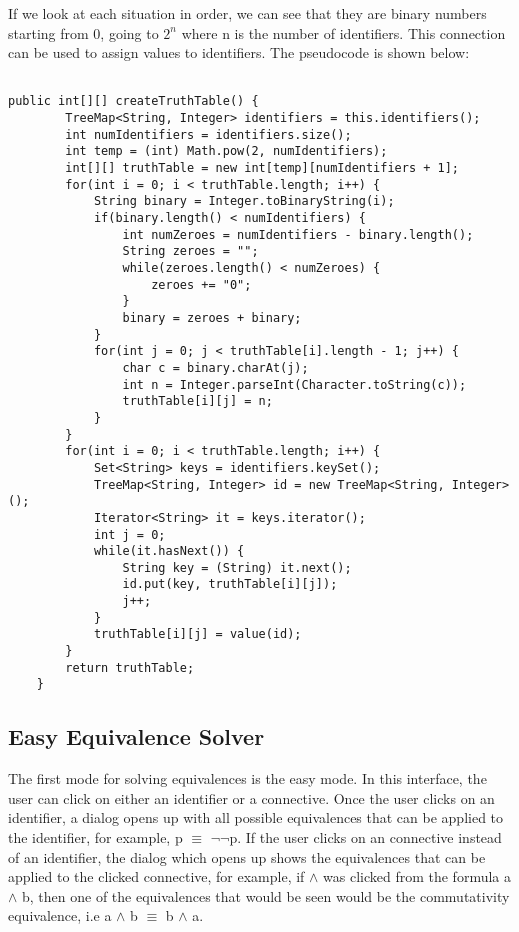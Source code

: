 \documentclass{report}
\begin{document}
If we look at each situation in order, we can see that they are binary numbers
starting from 0, going to $2^n$ where n is the number of identifiers. This
connection can be used to assign values to identifiers. The pseudocode is shown
below:

\begin{verbatim}

public int[][] createTruthTable() {
		TreeMap<String, Integer> identifiers = this.identifiers();
		int numIdentifiers = identifiers.size();
		int temp = (int) Math.pow(2, numIdentifiers);
		int[][] truthTable = new int[temp][numIdentifiers + 1];
		for(int i = 0; i < truthTable.length; i++) {
			String binary = Integer.toBinaryString(i);
			if(binary.length() < numIdentifiers) {
				int numZeroes = numIdentifiers - binary.length();
				String zeroes = "";
				while(zeroes.length() < numZeroes) {
					zeroes += "0";
				}
				binary = zeroes + binary;
			}
			for(int j = 0; j < truthTable[i].length - 1; j++) {
				char c = binary.charAt(j);
				int n = Integer.parseInt(Character.toString(c));
				truthTable[i][j] = n;
			}
		}
		for(int i = 0; i < truthTable.length; i++) {
			Set<String> keys = identifiers.keySet();
			TreeMap<String, Integer> id = new TreeMap<String, Integer>();
			Iterator<String> it = keys.iterator();
			int j = 0;
			while(it.hasNext()) {
				String key = (String) it.next();
				id.put(key, truthTable[i][j]);
				j++;
			}
			truthTable[i][j] = value(id);
		}
		return truthTable;
	}

\end{verbatim}

\subsection{Easy Equivalence Solver}

The first mode for solving equivalences is the easy mode. In this interface,
the user can click on either an identifier or a connective. Once the user
clicks on an identifier, a dialog opens up with all possible equivalences
that can be applied to the identifier, for example, p $\equiv$ $\neg$$\neg$p.
If the user clicks on an connective instead of an identifier, the dialog which
opens up shows the equivalences that can be applied to the clicked connective,
for example, if $\land$ was clicked from the formula a $\land$ b, then
one of the equivalences that would be seen would be the commutativity
equivalence, i.e a $\land$ b $\equiv$ b $\land$ a.

\end{document}
